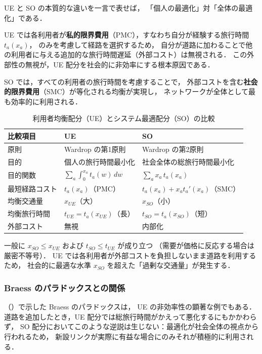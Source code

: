 UE と SO の本質的な違いを一言で表せば，
「個人の最適化」対「全体の最適化」である．

UE では各利用者が\textbf{私的限界費用}（PMC），すなわち自分が経験する旅行時間 $t_a(x_a)$，
のみを考慮して経路を選択するため，
自分が道路に加わることで他の利用者に与える追加的な旅行時間遅延（外部コスト）は無視される．
この外部性の無視が，UE 配分を社会的に非効率にする根本原因である．

SO では，すべての利用者の旅行時間を考慮することで，
外部コストを含む\textbf{社会的限界費用}（SMC）が等化される均衡が実現し，
ネットワークが全体として最も効率的に利用される．

\begin{table}[hbtp]
  \centering
  \caption{利用者均衡配分（UE）とシステム最適配分（SO）の比較}
  \label{tab:ue-so-comparison}
  \begin{tabular}{lll}
    \toprule
    比較項目 & UE & SO \\
    \midrule
    原則 & Wardrop の第1原則 & Wardrop の第2原則 \\
    目的 & 個人の旅行時間最小化 & 社会全体の総旅行時間最小化 \\
    目的関数 &
      $\displaystyle\sum_{a}\int_0^{x_a} t_a(w)\,dw$ &
      $\displaystyle\sum_{a} x_a\, t_a(x_a)$ \\[4pt]
    最短経路コスト & $t_a(x_a)$（PMC） & $t_a(x_a)+x_a t_a'(x_a)$（SMC） \\
    均衡交通量 & $x_{UE}$（大） & $x_{SO}$（小） \\
    均衡旅行時間 & $t_{UE} = t_a(x_{UE})$（長） & $t_{SO} = t_a(x_{SO})$（短） \\
    外部コスト & 無視 & 内部化 \\
    \bottomrule
  \end{tabular}
\end{table}

一般に $x_{SO} \leq x_{UE}$ および $t_{SO} \leq t_{UE}$ が成り立つ
（需要が価格に反応する場合は厳密不等号）．
UE では各利用者が外部コストを負担しないまま道路を利用するため，
社会的に最適な水準 $x_{SO}$ を超えた「過剰な交通量」が発生する．

\subsubsection*{Braess のパラドックスとの関係}

（）で示した Braess のパラドックスは，
UE の非効率性の顕著な例でもある．
道路を追加したとき，UE 配分では総旅行時間がかえって悪化するにもかかわらず，
SO 配分においてこのような逆説は生じない：最適化が社会全体の視点から行われるため，
新設リンクが実際に有益な場合にのみそれが積極的に利用される\cite{Braess1968}．

